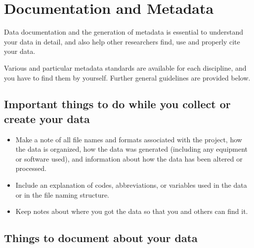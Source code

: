 \section{Documentation and Metadata}

Data documentation and the generation of metadata is essential to understand
your data in detail, and also help other researchers find, use and properly
cite your data.


Various and particular metadata standards are available for each discipline, and
you have to find them by yourself. Further general guidelines are provided below.

\subsection{Important things to do while you collect or create your data}

\begin{itemize}
  \item Make a note of all file names and formats associated with the project,
        how the data is organized, how the data was generated (including any
        equipment or software used), and information about how the data has been
        altered or processed.
  \item Include an explanation of codes, abbreviations, or variables used in the
        data or in the file naming structure.
  \item Keep notes about where you got the data so that you and others
        can find it.
\end{itemize}

\subsection{Things to document about your data}\label{sc:data-documentation}

